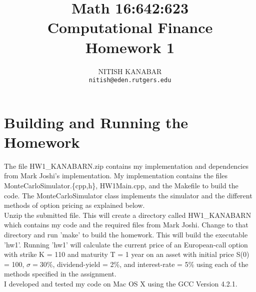 \documentclass[letterpaper,twoside,11pt,fleqn]{article}
\begin{document}

\title{Math 16:642:623 \\Computational Finance \\ Homework 1}
\author{NITISH KANABAR \\ \texttt{nitish@eden.rutgers.edu}}

\maketitle

\thispagestyle{empty} 

\cleardoublepage

\pagestyle{plain} 
\setcounter{page}{1}


\section*{Building and Running the Homework}

The file HW1\_KANABARN.zip contains my implementation and dependencies from Mark Joshi's implementation. My implementation contains the files MonteCarloSimulator.\{cpp,h\}, HW1Main.cpp, and the Makefile to build the code. The MonteCarloSimulator class implements the simulator and the different methods of option pricing as explained below. \\

Unzip the submitted file. This will create a directory called HW1\_KANABARN which contains my code and the required files from Mark Joshi.  Change to that directory and run 'make' to build the homework.  This will build the executable 'hw1'.  Running 'hw1' will calculate the current price of an European-call option with strike K = 110 and maturity T = 1 year on an asset with initial price S(0) = 100, \(\sigma = 30\%\), dividend-yield =  2\%, and interest-rate = 5\% using each of the methods specified in the assignment.  \\

I developed and tested my code on Mac OS X using the GCC Version 4.2.1.
\end{document}
